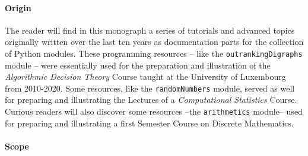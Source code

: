 %
%

\preface





\paragraph{Origin}

The reader will find in this monograph a series of tutorials and advanced topics originally written over the last ten years as documentation parts for the \Digraph collection of Python modules. These programming resources -- like the \texttt{outrankingDigraphs} module -- were essentially used for the preparation and illustration of the \emph{Algorithmic Decision Theory} Course taught at the University of Luxembourg from 2010-2020. Some resources, like the \texttt{randomNumbers} module, served as well for preparing and illustrating the Lectures of a \emph{Computational Statistics} Course. Curious readers will also discover some resources --the \texttt{arithmetics} module-- used for preparing and illustrating a first Semester Course on Discrete Mathematics.

\paragraph{Scope}

